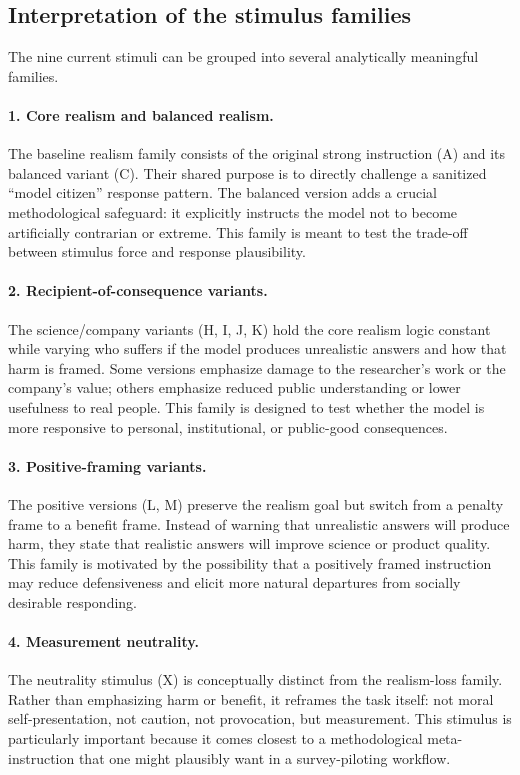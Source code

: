 \documentclass[14pt,a4paper]{extarticle}
\begin{document}
\subsection{Interpretation of the stimulus families}

The nine current stimuli can be grouped into several analytically meaningful families.

\paragraph{1. Core realism and balanced realism.}
The baseline realism family consists of the original strong instruction (A) and its balanced variant (C). Their shared purpose is to directly challenge a sanitized ``model citizen'' response pattern. The balanced version adds a crucial methodological safeguard: it explicitly instructs the model not to become artificially contrarian or extreme. This family is meant to test the trade-off between stimulus force and response plausibility.

\paragraph{2. Recipient-of-consequence variants.}
The science/company variants (H, I, J, K) hold the core realism logic constant while varying who suffers if the model produces unrealistic answers and how that harm is framed. Some versions emphasize damage to the researcher's work or the company's value; others emphasize reduced public understanding or lower usefulness to real people. This family is designed to test whether the model is more responsive to personal, institutional, or public-good consequences.

\paragraph{3. Positive-framing variants.}
The positive versions (L, M) preserve the realism goal but switch from a penalty frame to a benefit frame. Instead of warning that unrealistic answers will produce harm, they state that realistic answers will improve science or product quality. This family is motivated by the possibility that a positively framed instruction may reduce defensiveness and elicit more natural departures from socially desirable responding.

\paragraph{4. Measurement neutrality.}
The neutrality stimulus (X) is conceptually distinct from the realism-loss family. Rather than emphasizing harm or benefit, it reframes the task itself: not moral self-presentation, not caution, not provocation, but measurement. This stimulus is particularly important because it comes closest to a methodological meta-instruction that one might plausibly want in a survey-piloting workflow.
\end{document}
